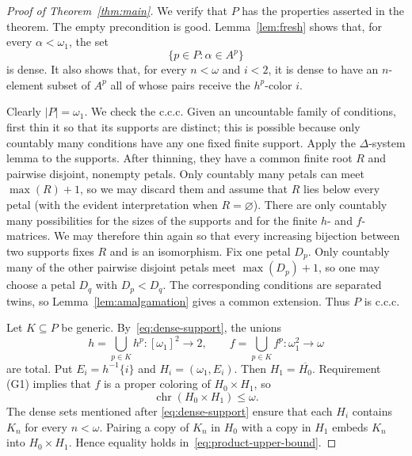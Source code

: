 \documentclass{amsart}
\numberwithin{equation}{section}
\theoremstyle{definition}
\theoremstyle{remark}
\newcommand{\chr}{\operatorname{chr}}
\begin{document}
\begin{proof}[Proof of Theorem~\ref{thm:main}]
We verify that $P$ has the properties asserted in the theorem.
The empty precondition is good.  Lemma~\ref{lem:fresh} shows that, for
every $\alpha<\omega_1$, the set
\begin{equation}\label{eq:dense-support}
 \{p\in P:\alpha\in A^p\}
\end{equation}
is dense.  It also shows that, for every $n<\omega$ and $i<2$, it is
dense to have an $n$-element subset of $A^p$ all of whose pairs receive
the $h^p$-color $i$.

Clearly $|P|=\omega_1$.  We check the c.c.c.  Given an uncountable
family of conditions, first thin it so that its supports are distinct;
this is possible because only countably many conditions have any one
fixed finite support.  Apply the $\Delta$-system lemma to the supports.
After thinning, they have a common finite root $R$ and pairwise
disjoint, nonempty petals.  Only countably many petals can meet
$\max(R)+1$, so we may discard them and assume that $R$ lies below
every petal (with the evident interpretation when $R=\varnothing$).
There are only countably many possibilities for the sizes of the
supports and for the finite $h$- and $f$-matrices.  We may therefore
thin again so that every increasing bijection between two supports
fixes $R$ and is an isomorphism.  Fix one petal $D_p$.  Only countably
many of the other pairwise disjoint petals meet $\max(D_p)+1$, so one
may choose a petal $D_q$ with $D_p<D_q$.  The corresponding conditions
are separated twins, so
Lemma~\ref{lem:amalgamation} gives a common extension.  Thus $P$ is
c.c.c.

Let $K\subseteq P$ be generic.  By~\eqref{eq:dense-support}, the unions
\begin{displaymath}
 h=\bigcup_{p\in K}h^p:[\omega_1]^2\longrightarrow2,
 \qquad
 f=\bigcup_{p\in K}f^p:\omega_1^2\longrightarrow\omega
\end{displaymath}
are total.  Put $E_i=h^{-1}\{i\}$ and $H_i=(\omega_1,E_i)$.
Then $H_1=\overline{H_0}$.  Requirement (G1) implies that $f$ is a
proper coloring of $H_0\times H_1$, so
\begin{equation}\label{eq:product-upper-bound}
 \chr(H_0\times H_1)\leq\omega.
\end{equation}
The dense sets mentioned after \eqref{eq:dense-support} ensure that
each $H_i$ contains
$K_n$ for every $n<\omega$.  Pairing a copy of $K_n$ in $H_0$ with a
copy in $H_1$ embeds $K_n$ into $H_0\times H_1$.  Hence equality holds
in~\eqref{eq:product-upper-bound}.


\end{proof}
\end{document}
